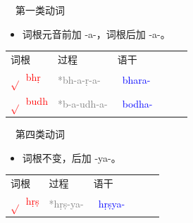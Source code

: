 \documentclass[17pt]{beamer}
\newcommand{\skt}[1]{{\sanskritfont{#1}}} %
\newcommand{\verbroot}[1]{\textcolor{red}{$\sqrt{}$#1}}
\newcommand{\sktroot}[1]{{\verbroot{\skt{#1}}}}
\newcommand{\skttransroot}[1]{{\sktroot{#1}~\textcolor{red}{#1}}}
\newcommand{\verbstem}[1]{\textcolor{blue}{#1\nobreakdash-}}
\newcommand{\sktverbstem}[1]{{\textcolor{blue}{\skt{#1\nobreakdash-}}}}
\newcommand{\skttransverbstem}[1]{{\sktverbstem{#1}~\verbstem{#1}}}
\newcommand{\notsoimportant}[1]{\textcolor{gray}{#1}}
\begin{document}
\begin{frame}{\insertsubsection ~~第一类动词}
  \small
  \begin{itemize}
    \item
      词根元音前加 \nobreakdash-a\nobreakdash-，词根后加 \nobreakdash-a\nobreakdash-。
  \end{itemize} 

  \centering
  \begin{tabular}{@{}llllll@{}} %
    词根 & 过程 & 语干  \\
    \skttransroot{bhṛ} & \notsoimportant{*bh-a-ṛ-a-} & \skttransverbstem{bhara}  \\
    \skttransroot{budh} & \notsoimportant{*b-a-udh-a-} & \skttransverbstem{bodha}  \\
  \end{tabular}

\end{frame}

\begin{frame}{\insertsubsection ~~第四类动词}
  \small
  \begin{itemize}
    \item
      词根不变，后加 \nobreakdash-ya\nobreakdash-。
  \end{itemize} 

  \centering
  \begin{tabular}{@{}llllll@{}} %
    词根 & 过程 & 语干  \\
    \skttransroot{hṛṣ} & \textcolor{gray}{*hṛṣ-ya-} & \skttransverbstem{hṛṣya}  \\
  \end{tabular}

\end{frame}
\end{document}
